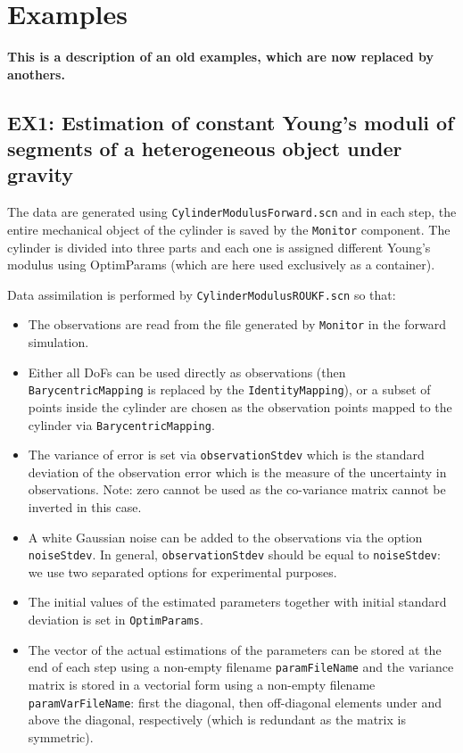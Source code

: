 \documentclass[10pt]{article}
\begin{document}
\section{Examples}

{\large\bf This is a description of an old examples, which are now replaced by anothers.}

\subsection{EX1: Estimation of constant Young's moduli of segments of a heterogeneous object under gravity}

The data are generated using \texttt{CylinderModulusForward.scn} and in each step, the entire mechanical object of the cylinder is saved by the
\texttt{Monitor} component.
The cylinder is divided into three parts and each one is assigned different Young's modulus using OptimParams  (which are here used exclusively as a
container).

Data assimilation is performed by \texttt{CylinderModulusROUKF.scn} so that:
\begin{itemize}
 \item The observations are read from the file generated by \texttt{Monitor} in the forward simulation. 
 \item Either all DoFs can be used directly as observations (then \texttt{BarycentricMapping} is replaced by the \texttt{IdentityMapping}), or 
 a subset of points inside the cylinder are chosen as the observation points mapped to the cylinder via \texttt{BarycentricMapping}.
 \item The variance of error is set via \texttt{observationStdev} which is the standard deviation of the observation error which is the measure of the
uncertainty in observations. Note: zero cannot be used as the co-variance matrix cannot be inverted in this case.
 \item A white Gaussian noise can be added to the observations via the option \texttt{noiseStdev}. In general, \texttt{observationStdev} should be
equal to \texttt{noiseStdev}: we use two separated options for experimental purposes.
 \item The initial values of the estimated parameters together with initial standard deviation is set in \texttt{OptimParams}.
 \item The vector of the actual estimations of the parameters can be stored at the end of each step using a non-empty filename \texttt{paramFileName}
and the variance matrix is stored in a vectorial 
 form using a non-empty filename \texttt{paramVarFileName}: first the diagonal, then off-diagonal elements under and above the diagonal, respectively
(which is redundant as the matrix is symmetric). 
 \end{itemize}
 
\end{document}

